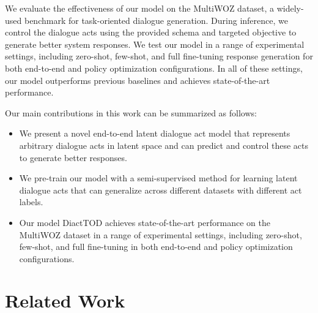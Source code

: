 We evaluate the effectiveness of our model on the MultiWOZ  \cite{DBLP:conf/emnlp/BudzianowskiWTC18} dataset, a widely-used benchmark for task-oriented dialogue generation.
During inference, we control the dialogue acts using the provided schema and targeted objective to generate better system responses.
We test our model in a range of experimental settings, including zero-shot, few-shot, and full fine-tuning response generation for both end-to-end and policy optimization configurations.
In all of these settings, our model outperforms previous baselines and achieves state-of-the-art performance.

Our main contributions in this work can be summarized as follows: 
\begin{itemize}
\item We present a novel end-to-end latent dialogue act model that represents arbitrary dialogue acts in latent space and can predict and control these acts to generate better responses.

\item We pre-train our model with a semi-supervised method for learning latent dialogue acts that can generalize across different datasets with different act labels. 

\item Our model DiactTOD achieves state-of-the-art performance on the MultiWOZ dataset in a range of experimental settings, including zero-shot, few-shot, and full fine-tuning in both end-to-end and policy optimization configurations.

\end{itemize}

\section{Related Work}

